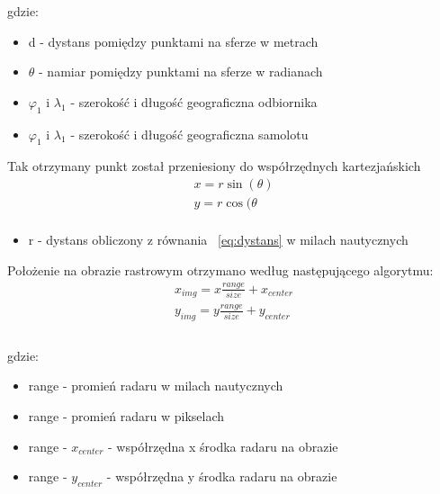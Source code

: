 \documentclass[eng,printmode]{mgr}
\begin{document}
\newpage
gdzie:
\begin{itemize}
\item d - dystans pomiędzy punktami na sferze w metrach
\item $\theta$ - namiar pomiędzy punktami na sferze w radianach
\item $\varphi_1$ i $\lambda_1$ - szerokość i długość geograficzna odbiornika
\item $\varphi_1$ i $\lambda_1$ - szerokość i długość geograficzna samolotu
\end{itemize}
\vskip 0.5cm
Tak otrzymany punkt został przeniesiony do współrzędnych kartezjańskich
\begin{equation}
\renewcommand*{\arraystretch}{1.3}
\begin{array}{ll}
x = r\sin(\theta)\\
y = r\cos(\theta\\
\end{array}
\end{equation}
\begin{itemize}
\item r - dystans obliczony z równania ~\ref{eq:dystans} w milach nautycznych
\end{itemize}
\vskip 0.5cm

Położenie na obrazie rastrowym otrzymano według następującego algorytmu:
\begin{equation}
\renewcommand*{\arraystretch}{1.3}
\begin{array}{ll}
x_{img} = x \frac{range}{size} + x_{center}\\
y_{img} = y \frac{range}{size} + y_{center}\\
\end{array}
\end{equation}
\\

gdzie:
\begin{itemize}
\item range - promień radaru w milach nautycznych
\item range - promień radaru w pikselach
\item range - $x_{center}$ - współrzędna x środka radaru na obrazie
\item range - $y_{center}$ - współrzędna y środka radaru na obrazie
\end{itemize}
\end{document}
